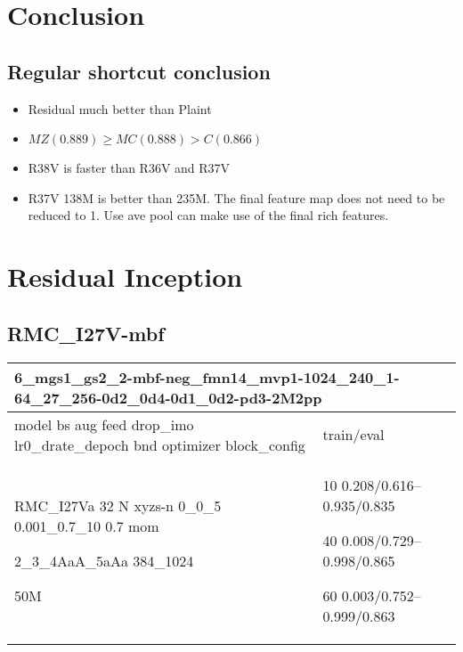 \documentclass[,table,dvipsnames]{article}
\begin{document}
\section{Conclusion}
\subsection{Regular shortcut conclusion}
\begin{itemize}
	\item Residual much better than Plaint
	\item $MZ(0.889) \geq MC(0.888) > C(0.866)$
	\item R38V is faster than R36V and R37V
	\item R37V 138M is better than 235M. The final feature map does not need to be reduced to 1. Use ave pool can make use of the final rich features.
\end{itemize}	

\section{Residual Inception}
\subsection{RMC\_I27V-mbf}
\noindent\begin{tabular}{|p{10cm}|p{5cm}| }	
	\hline
	\multicolumn{2}{|p{15cm}|}{ 6\_mgs1\_gs2\_2-mbf-neg\_fmn14\_mvp1-1024\_240\_1-64\_27\_256-0d2\_0d4-0d1\_0d2-pd3-2M2pp }\\
	\hline
	model bs aug feed drop\_imo lr0\_drate\_depoch bnd optimizer block\_config & train/eval \\
	
	\rowcolor{red!20}
	RMC\_I27Va 32 N xyzs-n 0\_0\_5 0.001\_0.7\_10 0.7 mom\par 2\_3\_4AaA\_5aAa 384\_1024\par 50M& 
	10 0.208/0.616--0.935/0.835\par 40 0.008/0.729--0.998/0.865\par 60 0.003/0.752--0.999/0.863\\
	
	
	\hline 
\end{tabular}
\end{document}
